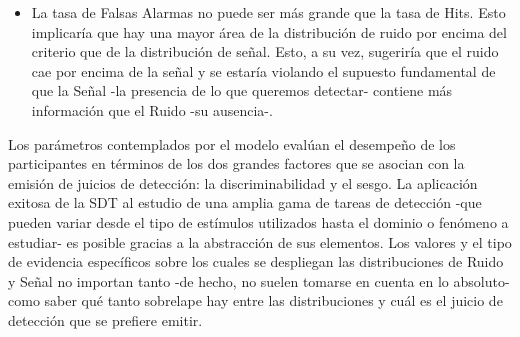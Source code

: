 \begin{enumerate}
\begin{itemize}
  \item La tasa de Falsas Alarmas no puede ser más grande que la tasa de Hits. Esto implicaría que hay una mayor área de la distribución de ruido por encima del criterio que de la distribución de señal. Esto, a su vez, sugeriría que el ruido cae por encima de la señal y se estaría violando el supuesto fundamental de que la Señal -la presencia de lo que queremos detectar- contiene más información que el Ruido -su ausencia-.\\
  \end{itemize}
\end{enumerate}

Los parámetros contemplados por el modelo evalúan el desempeño de los participantes en términos de los dos grandes factores que se asocian con la emisión de juicios de detección: la discriminabilidad y el sesgo. La aplicación exitosa de la SDT al estudio de una amplia gama de tareas de detección -que pueden variar desde el tipo de estímulos utilizados hasta el dominio o fenómeno a estudiar- es posible gracias a la abstracción de sus elementos. Los valores y el tipo de evidencia específicos sobre los cuales se despliegan las distribuciones de Ruido y Señal no importan tanto -de hecho, no suelen tomarse en cuenta en lo absoluto- como saber qué tanto sobrelape hay entre las distribuciones y cuál es el juicio de detección que se prefiere emitir.\\

